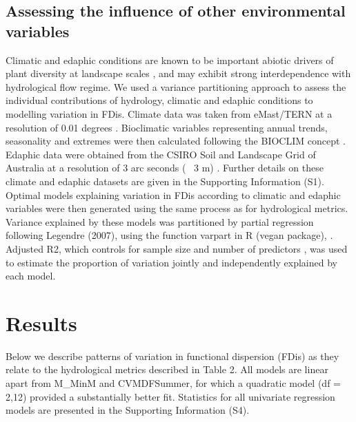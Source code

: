 \documentclass[openright,12pt,a4paper]{memoir}
\begin{document}
\subsection{Assessing the influence of other environmental variables}
Climatic and edaphic conditions are known to be important abiotic drivers of plant diversity at landscape scales \cite{Laliberte2013, Vazquez2015}, and may exhibit strong interdependence with hydrological flow regime. We used a variance partitioning approach to assess the individual contributions of hydrology, climatic and edaphic conditions to modelling variation in FDis. Climate data was taken from eMast/TERN at a resolution of 0.01 degrees \cite{Hutchinson2014}.  Bioclimatic variables representing annual trends, seasonality and extremes were then calculated following the BIOCLIM concept \cite{busby1991bioclim}. Edaphic data were obtained from the CSIRO Soil and Landscape Grid of Australia at a resolution of 3 arc seconds (~ 3 m) \cite{Rossel2014, Rossel2014a, Rossel2014b, Rossel2014c, Rossel2014d, Rossel2014e, Rossel2014f, Rossel2014g, Rossel2014h, Rossel2014i, Rossel2014j; Wilford2014}. Further details on these climate and edaphic datasets are given in the Supporting Information (S1). Optimal models explaining variation in FDis according to climatic and edaphic variables were then generated using the same process as for hydrological metrics. Variance explained by these models was partitioned by partial regression following Legendre (2007),  using the function varpart in R (vegan package), \cite{Oksanen2013}. Adjusted R2, which controls for sample size and number of predictors \cite{Peres-Neto2006}, was used to estimate the proportion of variation jointly and independently explained by each model.

\section{Results}
Below we describe patterns of variation in functional dispersion (FDis) as they relate to the hydrological metrics described in Table 2. All models are linear apart from M\_MinM and CVMDFSummer, for which a quadratic model (df = 2,12) provided a substantially better fit. Statistics for all univariate regression models are presented in the Supporting Information (S4).
\end{document}
